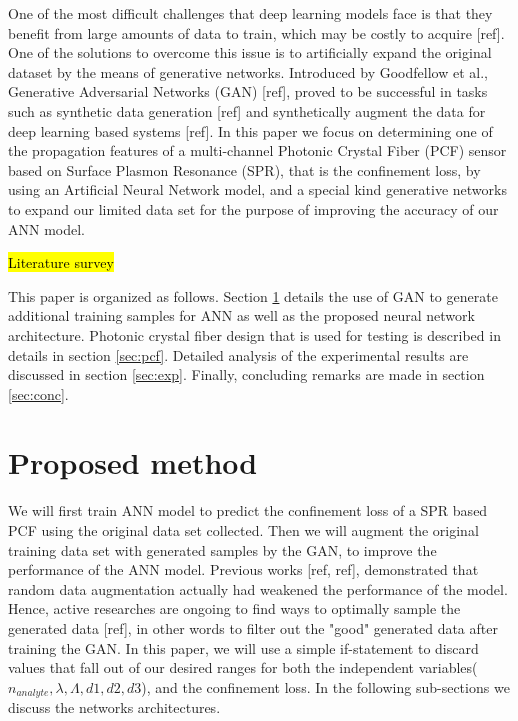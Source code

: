 \documentclass[draft, a4, 10pt, onecolumn]{IEEEtran}
\begin{document}
One of the most difficult challenges that deep learning models face is that they benefit from large amounts of data to train, which may be costly to acquire [ref]. One of the solutions to overcome this issue is to artificially expand the original dataset by the means of generative networks. Introduced by Goodfellow et al., Generative Adversarial Networks (GAN) [ref], proved to be successful in tasks such as synthetic data generation [ref] and synthetically augment the data for deep learning based systems [ref]. 
In this paper we focus on determining one of the propagation features of a multi-channel Photonic Crystal Fiber (PCF) sensor based on Surface Plasmon Resonance (SPR), that is the confinement loss, by using an Artificial Neural Network model, and a special kind generative networks to expand our limited data set for the purpose of  improving the accuracy of our ANN model.

\hl{Literature survey}

This paper is organized as follows. Section \ref{sec:prop} details the use of GAN to generate additional training samples for ANN as well as the proposed neural network architecture. Photonic crystal fiber design that is used for testing is described in details in section \ref{sec:pcf}. Detailed analysis of the experimental results are discussed in section \ref{sec:exp}. Finally, concluding remarks are made in section \ref{sec:conc}.

\section{Proposed method}
\label{sec:prop}

We will first train ANN model to predict the confinement loss of a SPR based PCF using the original data set collected. Then we will augment the original training data set with generated samples by the GAN, to improve the performance of the ANN model.
Previous works [ref, ref], demonstrated that random data augmentation actually had weakened the performance of the model. Hence, active researches are ongoing to find ways to optimally sample the generated data [ref], in other words to filter out the "good" generated data after training the GAN. In this paper, we will use a simple if-statement to discard values that fall out of our desired ranges for both the independent variables($n_{analyte}, \lambda, \Lambda, d1, d2, d3$), and the confinement loss. In the following sub-sections we discuss the networks architectures.
\end{document}
